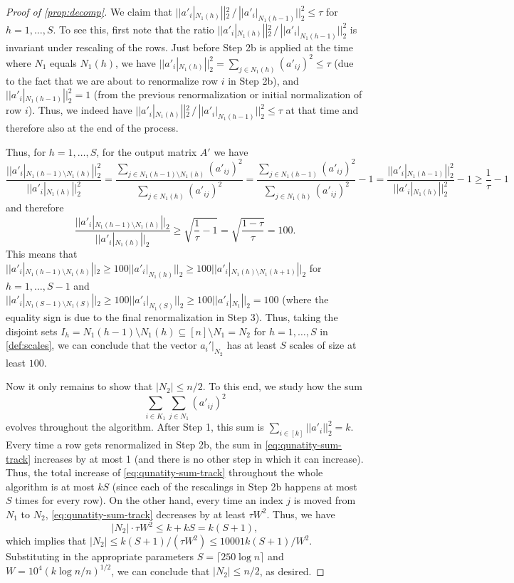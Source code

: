 \documentclass[reqno]{amsart}
\theoremstyle{remark}
\theoremstyle{definition}
\numberwithin{theorem}{section}
\renewcommand{\(}{\bigl(}
\renewcommand{\)}{\bigr)\vphantom{)}}
\renewcommand{\le}{\leqslant}
\renewcommand{\ge}{\geqslant}
\newcommand{\ceil}[1]{\lceil#1\rceil}
\begin{document}
\begin{proof}[Proof of \cref{prop:decomp}]
    We claim that $||a'_i|_{N_1(h)}||_2^2 \,/\,||a'_i|_{N_1(h-1)}||_2^2\le \tau $ for $h=1,\dots,S$. To see this, first note that the ratio $||a'_i|_{N_1(h)}||_2^2\, /\,||a'_i|_{N_1(h-1)}||_2^2$ is invariant under rescaling of the rows. Just before Step 2b is applied at the time where $N_1$ equals $N_1(h)$, we have $||a'_i|_{N_1(h)}||_2^2=\sum_{j\in N_1(h)}(a'_{ij})^2\le \tau$ (due to the fact that we are about to renormalize row $i$ in Step 2b), and $||a'_i|_{N_1(h-1)}||_2^2=1$ (from the previous renormalization or initial normalization of row $i$). Thus, we indeed have $||a'_i|_{N_1(h)}||_2^2\, /\,||a'_i|_{N_1(h-1)}||_2^2\le \tau $ at that time and therefore also at the end of the process. 

    Thus, for $h=1,\dots,S$, for the output matrix $A'$ we have
    \[\frac{||a'_i|_{N_1(h-1)\setminus N_1(h)}||_2^2}{||a'_i|_{N_1(h)}||_2^2}=\frac{\sum_{j\in N_1(h-1)\setminus N_1(h)}(a'_{ij})^2}{\sum_{j\in N_1(h)}(a'_{ij})^2}=\frac{\sum_{j\in N_1(h-1)}(a'_{ij})^2}{\sum_{j\in N_1(h)}(a'_{ij})^2}-1=\frac{||a'_i|_{N_1(h-1)}||_2^2}{||a'_i|_{N_1(h)}||_2^2}-1\ge \frac{1}{\tau}-1\]
    and therefore
    \[\frac{||a'_i|_{N_1(h-1)\setminus N_1(h)}||_2}{||a'_i|_{N_1(h)}||_2}\ge \sqrt{\frac{1}{\tau}-1}=\sqrt{\frac{1-\tau}{\tau}}=100.\]
    This means that $||a'_i|_{N_1(h-1)\setminus N_1(h)}||_2\ge 100 ||a'_i|_{N_1(h)}||_2\ge 100 ||a'_i|_{N_1(h)\setminus N_1(h+1)}||_2$ for $h=1,\dots,S-1$ and $||a'_i|_{N_1(S-1)\setminus N_1(S)}||_2\ge 100 ||a'_i|_{N_1(S)}||_2\ge 100 ||a'_i|_{N_1}||_2=100$ (where the equality sign is due to the final renormalization in Step 3). Thus, taking the disjoint sets $I_h=N_1(h-1)\setminus N_1(h)\subseteq [n]\setminus N_1=N_2$ for $h=1,\dots,S$ in \cref{def:scales}, we can conclude that the vector $a_i'|_{N_2}$ has at least $S$ scales of size at least $100$. 

    Now it only remains to show that $|N_2|\le n/2$. To this end, we study how the sum
    \begin{equation}\label{eq:qunatity-sum-track}
       \sum_{i\in K_1}\sum_{j\in N_1}(a'_{ij})^2 
    \end{equation}
    evolves throughout the algorithm. After Step 1, this sum is $\sum_{i\in [k]} ||a'_i||_2^2=k$. Every time a row gets renormalized in Step 2b, the sum in \eqref{eq:qunatity-sum-track} increases by at most 1 (and there is no other step in which it can increase). Thus, the total increase of \eqref{eq:qunatity-sum-track} throughout the whole algorithm is at most $kS$ (since each of the rescalings in Step 2b happens at most $S$ times for every row). On the other hand, every time an index $j$ is moved from $N_1$ to $N_2$,  \eqref{eq:qunatity-sum-track} decreases by at least $\tau W^2$. Thus, we have
    \[|N_2|\cdot \tau W^2 \le k+k S=k(S+1),\]
    which implies that $|N_2|\le k(S+1)/(\tau W^{2})\le 10001k(S+1)/W^{2}$. Substituting in the appropriate parameters $S= \ceil{250\log n}$ and $W= 10^4(k\log n/n)^{1/2}$, we can conclude that $|N_2|\le n/2$, as desired.
\end{proof}
\end{document}
